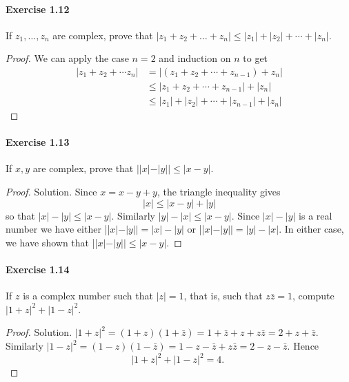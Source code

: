 \documentclass{article}
\theoremstyle{definition}
\begin{document}
\paragraph{Exercise 1.12} If $z_1, \ldots, z_n$ are complex, prove that $|z_1 + z_2 + \ldots + z_n| \leq |z_1| + |z_2| + \cdots + |z_n|$.
\begin{proof}
    We can apply the case $n=2$ and induction on $n$ to get
$$
\begin{aligned}
\left|z_1+z_2+\cdots z_n\right| &=\left|\left(z_1+z_2+\cdots+z_{n-1}\right)+z_n\right| \\
& \leq\left|z_1+z_2+\cdots+z_{n-1}\right|+\left|z_n\right| \\
& \leq\left|z_1\right|+\left|z_2\right|+\cdots+\left|z_{n-1}\right|+\left|z_n\right|
\end{aligned}
$$
\end{proof}


\paragraph{Exercise 1.13} If $x, y$ are complex, prove that $||x|-|y|| \leq |x-y|$.
\begin{proof}
    Solution. Since $x=x-y+y$, the triangle inequality gives
$$
|x| \leq|x-y|+|y|
$$
so that $|x|-|y| \leq|x-y|$. Similarly $|y|-|x| \leq|x-y|$. Since $|x|-|y|$ is a real number we have either ||$x|-| y||=|x|-|y|$ or ||$x|-| y||=|y|-|x|$. In either case, we have shown that ||$x|-| y|| \leq|x-y|$.
\end{proof}


\paragraph{Exercise 1.14} If $z$ is a complex number such that $|z|=1$, that is, such that $z \bar{z}=1$, compute $|1+z|^{2}+|1-z|^{2}$.
\begin{proof}
    Solution. $|1+z|^2=(1+z)(1+\bar{z})=1+\bar{z}+z+z \bar{z}=2+z+\bar{z}$. Similarly $|1-z|^2=(1-z)(1-\bar{z})=1-z-\bar{z}+z \bar{z}=2-z-\bar{z}$. Hence
$$
|1+z|^2+|1-z|^2=4 \text {. }
$$
\end{proof}
\end{document}
